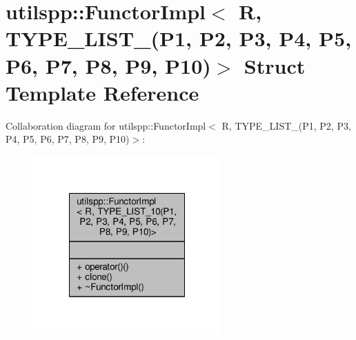 \hypertarget{structutilspp_1_1FunctorImpl_3_01R_00_01TYPE__LIST__10_07P1_00_01P2_00_01P3_00_01P4_00_01P5_00_0dcb5930806c25abd002b833487c3746a}{\section{utilspp\-:\-:Functor\-Impl$<$ R, T\-Y\-P\-E\-\_\-\-L\-I\-S\-T\-\_(P1, P2, P3, P4, P5, P6, P7, P8, P9, P10)$>$ Struct Template Reference}
\label{structutilspp_1_1FunctorImpl_3_01R_00_01TYPE__LIST__10_07P1_00_01P2_00_01P3_00_01P4_00_01P5_00_0dcb5930806c25abd002b833487c3746a}
}


Collaboration diagram for utilspp\-:\-:Functor\-Impl$<$ R, T\-Y\-P\-E\-\_\-\-L\-I\-S\-T\-\_(P1, P2, P3, P4, P5, P6, P7, P8, P9, P10)$>$\-:\nopagebreak
\begin{figure}[H]
\begin{center}
\leavevmode
\includegraphics[width=204pt]{structutilspp_1_1FunctorImpl_3_01R_00_01TYPE__LIST__10_07P1_00_01P2_00_01P3_00_01P4_00_01P5_00_0c8371b2be0f819f634b09b6aafbc3c27}
\end{center}
\end{figure}
